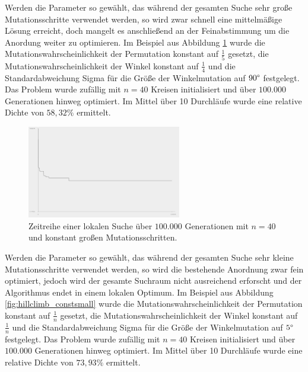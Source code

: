 \documentclass[twoside,bibtotoc]{report}
\begin{document}
\nsecend %




Werden die Parameter so gewählt, das während der gesamten Suche sehr große Mutationsschritte verwendet werden, so wird zwar schnell eine mittelmäßige Lösung erreicht, doch mangelt es anschließend an der Feinabstimmung um die Anordung weiter zu optimieren.
Im Beispiel aus Abbildung \ref{fig:hillclimb_constbig} wurde die Mutationswahrscheinlichkeit der Permutation konstant auf $\frac{1}{5}$ gesetzt, die Mutationswahrscheinlichkeit der Winkel konstant auf $\frac{1}{4}$ und die Standardabweichung Sigma für die Größe der Winkelmutation auf $90\degree$ festgelegt.
Das Problem wurde zufällig mit $n = 40$ Kreisen initialisiert und über $100.000$ Generationen hinweg optimiert.
Im Mittel über 10 Durchläufe wurde eine relative Dichte von $58,32\%$ ermittelt.

\begin{figure}[h]
 \centering
 \includegraphics [width=0.6\textwidth]{Bilder/Hillclimb_constbig.png}
 \caption{
 	Zeitreihe einer lokalen Suche über $100.000$ Generationen mit $n = 40$
 	und konstant großen Mutationsschritten.
 	}
 \label{fig:hillclimb_constbig}
\end{figure}

\nsecend%



Werden die Parameter so gewählt, das während der gesamten Suche sehr kleine Mutationsschritte verwendet werden, so wird die bestehende Anordnung zwar fein optimiert, jedoch wird der gesamte Suchraum nicht ausreichend erforscht und der Algorithmus endet in einem lokalen Optimum.
Im Beispiel aus Abbildung \ref{fig:hillclimb_constsmall} wurde die Mutationswahrscheinlichkeit der Permutation konstant auf $\frac{1}{n}$ gesetzt, die Mutationswahrscheinlichkeit der Winkel konstant auf $\frac{1}{n}$ und die Standardabweichung Sigma für die Größe der Winkelmutation auf $5\degree$ festgelegt.
Das Problem wurde zufällig mit $n = 40$ Kreisen initialisiert und über $100.000$ Generationen hinweg optimiert.
Im Mittel über 10 Durchläufe wurde eine relative Dichte von $73,93\%$ ermittelt.
\end{document}
